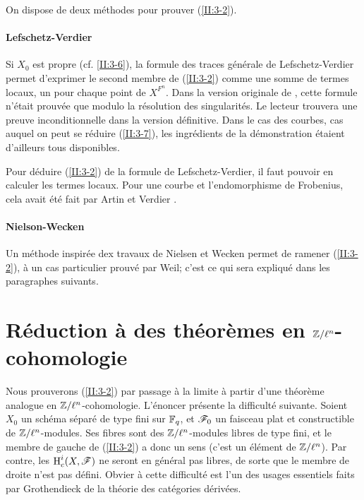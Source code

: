 \documentclass[oneside]{book}
\begin{document}
On dispose de deux méthodes pour prouver (\ref{II:3-2}). 


\paragraph{Lefschetz-Verdier}
Si $X_0$ est propre (cf. \ref{II:3-6}), la formule des traces générale de 
Lefschetz-Verdier permet d'exprimer le second membre de (\ref{II:3-2}) comme 
une somme de termes locaux, un pour chaque point de $X^{F^n}$. Dans la version 
originale de \cite{SGA5}, cette formule n'était prouvée que modulo la 
résolution des singularités. Le lecteur trouvera une preuve inconditionnelle 
dans la version définitive. Dans le cas des courbes, cas auquel on peut se 
réduire (\ref{II:3-7}), les ingrédients de la démonstration étaient 
d'ailleurs tous disponibles. 

Pour déduire (\ref{II:3-2}) de la formule de Lefschetz-Verdier, il faut 
pouvoir en calculer les termes locaux. Pour une courbe et l'endomorphisme de 
Frobenius, cela avait été fait par Artin et Verdier \cite{II:V}. 


\paragraph{Nielson-Wecken}
Un méthode inspirée dex travaux de Nielsen et Wecken permet de ramener 
(\ref{II:3-2}), à un cas particulier prouvé par Weil; c'est ce qui sera 
expliqué dans les paragraphes suivants. 










\section{Réduction à des théorèmes en \texorpdfstring{$\mathbb{Z}/\ell^n$}{Z/l n}-cohomologie}\label{II:4}

Nous prouverons (\ref{II:3-2}) par passage à la limite à partir d'une 
théorème analogue en $\mathbb{Z}/\ell^n$-cohomologie. L'énoncer présente la 
difficulté suivante. Soient $X_0$ un schéma séparé de type fini sur 
$\mathbb{F}_q$, et $\mathscr{F}_0$ un faisceau plat et constructible de $\mathbb{Z}/\ell^n$-modules. 
Ses fibres sont des $\mathbb{Z}/\ell^n$-modules libres de type fini, et le membre de 
gauche de (\ref{II:3-2}) a donc un sens (c'est un élément de $\mathbb{Z}/\ell^n$). 
Par contre, les $\operatorname{H}_c^i(X,\mathscr{F})$ ne seront en général pas libres, de sorte 
que le membre de droite n'est pas défini. Obvier à cette difficulté est 
l'un des usages essentiels faits par Grothendieck de la théorie des 
catégories dérivées.
\end{document}
